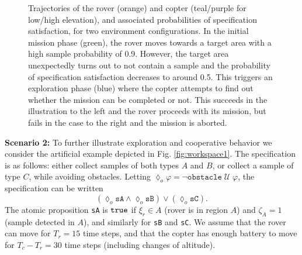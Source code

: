 \documentclass[conference]{IEEEtran}
\begin{document}
\begin{figure}
\begin{center}
\end{center}
  \caption{Trajectories of the rover (orange) and copter (teal/purple for low/high elevation), and associated probabilities of specification satisfaction, for two environment configurations. In the initial mission phase (green), the rover moves towards a target area with a high sample probability of 0.9. However, the target area unexpectedly turns out to not contain a sample and the probability of specification satisfaction decreases to around 0.5. This triggers an exploration phase (blue) where the copter attempts to find out whether the mission can be completed or not. This succeeds in the illustration to the left and the rover proceeds with its mission, but fails in the case to the right and the mission is aborted.}
  \label{fig:marstrajectories}
\end{figure}


\noindent \textbf{Scenario 2:} To further illustrate exploration and cooperative behavior we consider the artificial example depicted in Fig. \ref{fig:workspace1}. The specification is as follows: either collect samples of both types $A$ and $B$, or collect a sample of type $C$, while avoiding obstacles. Letting $\lozenge_o \varphi = \lnot \texttt{obstacle} \; \mathcal U \; \varphi$, the specification can be written
\begin{equation*}
  \left( \lozenge_o \texttt{sA} \land \lozenge_o \texttt{sB} \right)  \lor \left( \lozenge_o  \texttt{sC}  \right).
\end{equation*}
The atomic proposition \texttt{sA} is $\texttt{true}$ if $\xi_r \in A$ (rover is in region $A$) and $\zeta_A = 1$ (sample detected in $A$), and similarly for \texttt{sB} and \texttt{sC}. We assume that the rover can move for $T_r = 15$ time steps, and that the copter has enough battery to move for $T_c - T_r = 30$ time steps (including changes of altitude). 
\end{document}

